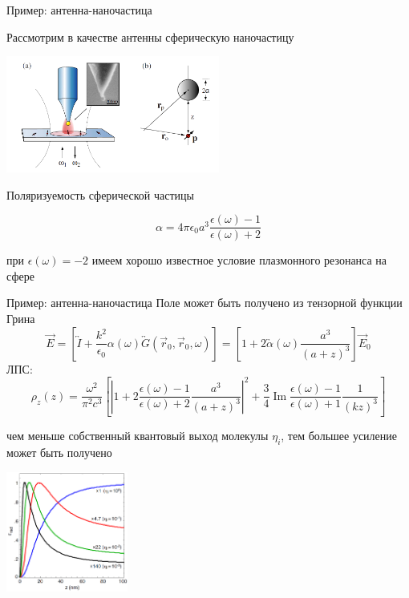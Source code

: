 \documentclass[9pt, compress, xcolor=table]{beamer}
\DeclareMathOperator{\Ima}{Im}
\begin{document}
\begin{frame}{Пример: антенна-наночастица}

Рассмотрим в качестве антенны сферическую наночастицу

\begin{center}
\includegraphics[width=7cm]{optant_5}
\end{center}

 Поляризуемость сферической частицы

\begin{equation*}
\alpha=4 \pi \epsilon_0 a^3 \frac{\epsilon(\omega)-1}{\epsilon(\omega)+2}
\end{equation*}

при $\epsilon(\omega)=-2$ имеем хорошо известное условие плазмонного резонанса на
сфере

\end{frame}


\begin{frame}{Пример: антенна-наночастица}
Поле может быть получено из тензорной функции Грина
\begin{equation*}
\vec E = \left[\overleftrightarrow I + \frac{k^2}{\epsilon_0}\alpha(\omega)
\overleftrightarrow G(\vec r_0, \vec r_0,\omega)\right] = \left[1+ 2 \overleftrightarrow\alpha(\omega)
\frac{a^3}{(a+z)^3}\right]\vec E_0
\end{equation*}
ЛПС:
\begin{equation*} 
\rho_z(z)= \frac{\omega^2}{\pi^2 c^3}\left[\left|1+2
\frac{\epsilon(\omega)-1}{\epsilon(\omega)+2}\frac{a^3}{(a+z)^3}\right|^2+ \frac{3}{4} \Ima\frac{\epsilon(\omega)-1}{\epsilon(\omega)+1}\frac{1}{(kz)^3}\right]
\end{equation*}

чем меньше собственный квантовый выход молекулы $\eta_i$, тем большее усиление может
быть получено
\begin{center}
\includegraphics[width=4cm]{optant_6}
\end{center}

\end{frame}
\end{document}
